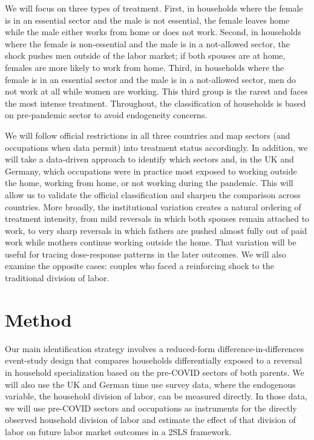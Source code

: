 \documentclass[12pt]{article}
\begin{document}
We will focus on three types of treatment. First, in households where the female is in an essential sector and the male is not essential, the female leaves home while the male either works from home or does not work. Second, in households where the female is non-essential and the male is in a not-allowed sector, the shock pushes men outside of the labor market; if both spouses are at home, females are more likely to work from home. Third, in households where the female is in an essential sector and the male is in a not-allowed sector, men do not work at all while women are working. This third group is the rarest and faces the most intense treatment. Throughout, the classification of households is based on pre-pandemic sector to avoid endogeneity concerns.

We will follow official restrictions in all three countries and map sectors (and occupations when data permit) into treatment status accordingly. In addition, we will take a data-driven approach to identify which sectors and, in the UK and Germany, which occupations were in practice most exposed to working outside the home, working from home, or not working during the pandemic. This will allow us to validate the official classification and sharpen the comparison across countries. More broadly, the institutional variation creates a natural ordering of treatment intensity, from mild reversals in which both spouses remain attached to work, to very sharp reversals in which fathers are pushed almost fully out of paid work while mothers continue working outside the home. That variation will be useful for tracing dose-response patterns in the later outcomes. We will also examine the opposite cases: couples who faced a reinforcing shock to the traditional division of labor.


\section{Method}

Our main identification strategy involves a reduced-form difference-in-differences event-study design that compares households differentially exposed to a reversal in household specialization based on the pre-COVID sectors of both parents. We will also use the UK and German time use survey data, where the endogenous variable, the household division of labor, can be measured directly. In those data, we will use pre-COVID sectors and occupations as instruments for the directly observed household division of labor and estimate the effect of that division of labor on future labor market outcomes in a 2SLS framework.
\end{document}
